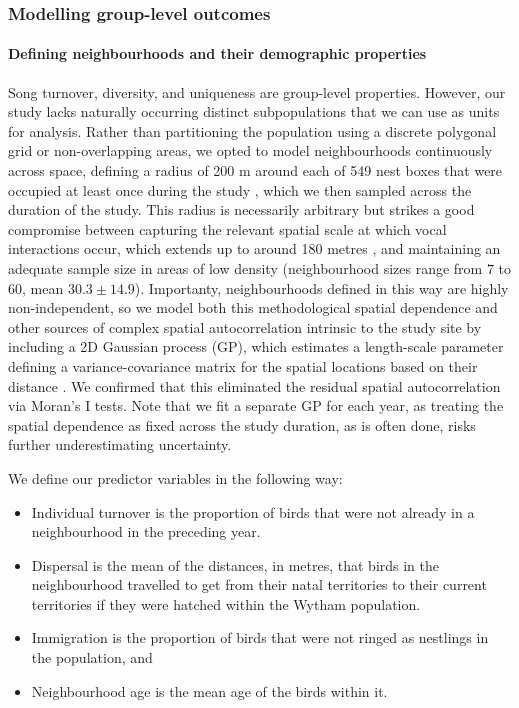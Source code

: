 \documentclass[9pt, onecolumn, twoside, lineno]{gsajnl}
\begin{document}
\subsubsection{\nmu Modelling group-level outcomes}
\label{sc:group-properties}


\paragraph{Defining neighbourhoods and their demographic properties}

Song turnover, diversity, and uniqueness are group-level properties. However, our study lacks naturally occurring distinct subpopulations that we can use as units for analysis. Rather than partitioning the population using a discrete polygonal grid or non-overlapping areas, we opted to model neighbourhoods continuously across space, defining a radius of 200 m around each of 549 nest boxes that were occupied at least once during the study \autocite{fayet2014}, which we then sampled across the duration of the study. This radius is necessarily arbitrary but strikes a good compromise between capturing the relevant spatial scale at which vocal interactions occur, which extends up to around 180 metres \autocite{bircher2021, blumenrath2004}, and maintaining an adequate sample size in areas of low density (neighbourhood sizes range from $7$ to $60$, mean $30.3\pm14.9$). Importanty, neighbourhoods defined in this way are highly non-independent, so we model both this methodological spatial dependence and other sources of complex spatial autocorrelation intrinsic to the study site by including a 2D Gaussian process (GP), which estimates a length-scale parameter defining a variance-covariance matrix for the spatial locations based on their distance \autocite{dearmon2016, gelfand2016, wright2021}. We confirmed that this eliminated the residual spatial autocorrelation via Moran's I tests. Note that we fit a separate GP for each year, as treating the spatial dependence as fixed across the study duration, as is often done, risks further underestimating uncertainty.

\noindent
We define our predictor variables in the following way: 
\begin{itemize}
    \item Individual turnover is the proportion of birds that were not already in a neighbourhood in the preceding year.
    \item Dispersal is the mean of the distances, in metres, that birds in the neighbourhood travelled to get from their natal territories to their current territories if they were hatched within the Wytham population. 
    \item Immigration is the proportion of birds that were not ringed as nestlings in the population, and 
    \item Neighbourhood age is the mean age of the birds within it. 
\end{itemize}
\end{document}
